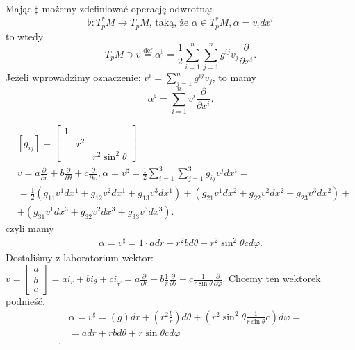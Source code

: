 \documentclass[../main.tex]{subfiles}
\begin{document}
    Mając $\sharp$ możemy zdefiniować operację odwrotną:
    \[
        \flat: T_p^*M\to T_pM\text{, taką, że } \alpha\in T_p^*M, \alpha = v_idx^i
    \]
    to wtedy
    \[
    T_pM \ni v \overset{\text{def}}{=} \alpha^\flat = \frac{1}{2} \sum_{i=1}^n \sum_{j=1}^n g^{ij}v_j \frac{\partial }{\partial x^i}
    .\]
    Jeżeli wprowadzimy oznaczenie: $v^i = \sum_{j=1}^n g^{ij}v_j$, to mamy
    \[
    \alpha^\flat = \sum_{i=1}^n v^i \frac{\partial }{\partial x^i}
    .\]

    \begin{przyklad}
        \begin{align*}
            &\left[ g_{ij} \right] = \begin{bmatrix} 1&&\\ &r^2& \\ &&r^2\sin^2\theta \end{bmatrix}\\
            &v = a \frac{\partial }{\partial r} + b \frac{\partial }{\partial \theta}  + c \frac{\partial }{\partial \varphi}, \alpha = v^{\sharp} = \frac{1}{2}\sum_{i=1}^3\sum_{j=1}^3 g_{ij}v^j dx^i = \\
            &= \frac{1}{2}\left( g_{11}v^1dx^1 + g_{12}v^2dx^1+g_{13}v^3dx^1 \right) + \left( g_{21}v^1dx^2 + g_{22}v^2dx^2 + g_{23}v^3dx^2 \right) +\\
            &+ \left(  g_{31}v^1dx^3 + g_{32}v^2dx^3 + g_{33}v^3dx^3 \right)
        .\end{align*}
        czyli mamy
        \begin{align*}
            \alpha = v^{\sharp} = 1\cdot a dr + r^2 b d\theta + r^2\sin^2\theta c d\varphi
        .\end{align*}
        Dostaliśmy z laboratorium wektor: $v = \begin{bmatrix} a\\b\\c \end{bmatrix} = a i_r + b i_\theta + c i_\varphi = a \frac{\partial }{\partial r} + b \frac{1}{r} \frac{\partial }{\partial \theta} + c \frac{1}{r\sin\theta} \frac{\partial }{\partial \varphi} $.
Chcemy ten wektorek podnieść.\\
\begin{align*}
    &\alpha = v^{\sharp} = \left( g \right) dr + \left( r^2 \frac{b}{r} \right) d\theta + \left( r^2 \sin^2\theta \frac{1}{r\sin\theta}c \right) d\varphi=\\
    &= a dr + r b d\theta + r \sin\theta c d\varphi \\
.\end{align*}
    \end{przyklad}
\end{document}
